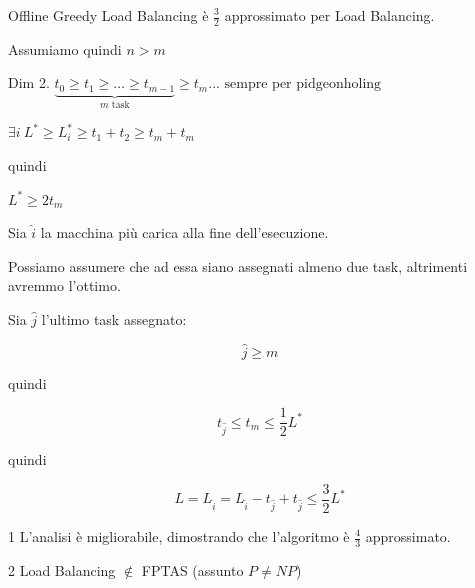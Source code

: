     \begin{teorema}
        Offline Greedy Load Balancing è $\frac{3}{2}$ approssimato per Load Balancing.
    \end{teorema}

    \begin{dimostrazione}

        \begin{rientro}
            Assumiamo quindi $n > m$
        \end{rientro}

            \begin{giustificazione}{Dim 2.}{}
                $\underbrace{t_0 \ge t_1 \ge \dots \ge t_{m-1}}_{m\text{ task}}
                \ge t_m \dots \text{ sempre per pidgeonholing}$

                $\exists i\ L^* \ge L^*_i \ge t_{1} + t_{2} \ge t_m + t_m$

                quindi

                $L^* \ge 2t_m$
            \end{giustificazione}

            Sia $\hat i$ la macchina più carica alla fine dell'esecuzione.

            Possiamo assumere che ad essa siano assegnati almeno due task, altrimenti avremmo l'ottimo.

            Sia $\hat j$ l'ultimo task assegnato:

            \[
                \hat j \ge m
            \]

            quindi

            \[
                t_{\hat j} \le t_m \le \frac 1 2 L^*
            \]

            quindi

            \[
                L = L_{\hat i} = L_{\hat i} - t_{\hat j} + t_{\hat j}
                \le \frac 3 2 L^*
            \]

            \begin{nota}{1}
                L'analisi è migliorabile, dimostrando che l'algoritmo è
                $\frac 4 3 $ approssimato.
            \end{nota}

            \begin{nota}{2}
                Load Balancing $\notin $ FPTAS (assunto $P \not = NP$)
            \end{nota}
    \end{dimostrazione}
